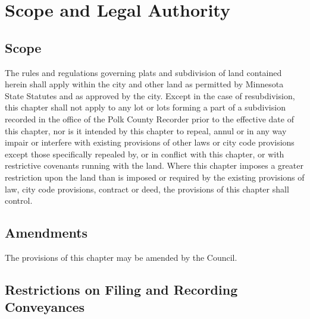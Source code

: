 \section{Scope and Legal Authority}
\subsection{Scope}
The rules and regulations governing plats and subdivision of land contained herein shall apply within the city and other land as permitted by Minnesota State Statutes and as approved by the city. Except in the case of resubdivision, this chapter shall not apply to any lot or lots forming a part of a subdivision recorded in the office of the Polk County Recorder prior to the effective date of this chapter, nor is it intended by this chapter to repeal, annul or in any way impair or interfere with existing provisions of other laws or city code provisions except those specifically repealed by, or in conflict with this chapter, or with restrictive covenants running with the land. Where this chapter imposes a greater restriction upon the land than is imposed or required by the existing provisions of law, city code provisions, contract or deed, the provisions of this chapter shall control.
\subsection{Amendments}
The provisions of this chapter may be amended by the Council.
\subsection{Restrictions on Filing and Recording Conveyances}

